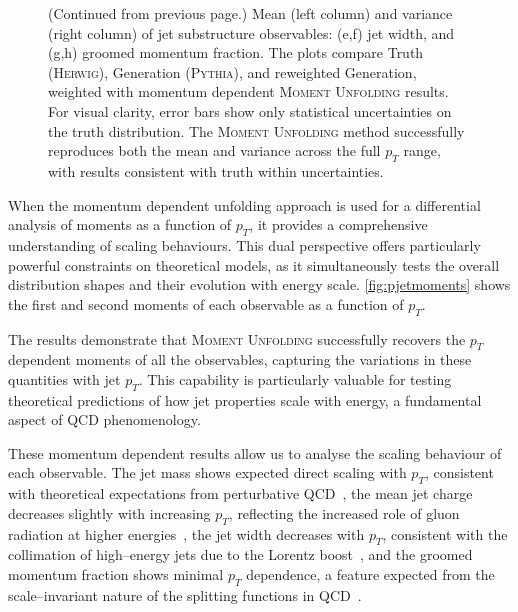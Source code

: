 \begin{figure}
{    \label{fig:pzgjetvar}}
    \caption[]{(Continued from previous page.) Mean (left column) and variance (right column) of jet substructure observables: (e,f) jet width, and (g,h) groomed momentum fraction. The plots compare Truth (\textsc{Herwig}), Generation (\textsc{Pythia}), and reweighted Generation, weighted with momentum dependent \textsc{Moment Unfolding} results. For visual clarity, error bars show only statistical uncertainties on the truth distribution. The \textsc{Moment Unfolding} method successfully reproduces both the mean and variance across the full $p_T$ range, with results consistent with truth within uncertainties.}
\end{figure}

            When the momentum dependent unfolding approach is used for a differential analysis of moments as a function of \(p_T\), it provides a comprehensive understanding of scaling behaviours.
            This dual perspective offers particularly powerful constraints on theoretical models, as it simultaneously tests the overall distribution shapes and their evolution with energy scale.
            \cref{fig:pjetmoments} shows the first and second moments of each observable as a function of $p_T$.

            The results demonstrate that \textsc{Moment Unfolding} successfully recovers the $p_T$ dependent moments of all the observables, capturing the variations in these quantities with jet \(p_T\).
            This capability is particularly valuable for testing theoretical predictions of how jet properties scale with energy, a fundamental aspect of QCD phenomenology.

            These momentum dependent results allow us to analyse the scaling behaviour of each observable.
            The jet mass shows expected direct scaling with $p_T$, consistent with theoretical expectations from perturbative QCD~\cite{ManganoINTRODUCTIONQCD, ParticleDataGroup:2020ssz, Czakon:2021mjy, CMS:2019fak, ALICE:2020pga, kogler_jet_2019, ALICE:2021njq, Dasgupta:2022fim, ATLAS:2014bjq},
            the mean jet charge decreases slightly with increasing $p_T$, reflecting the increased role of gluon radiation at higher energies~\cite{ATLAS:2015rlw, CMS:2017yer, Li:2019dre},
            the jet width decreases with $p_T$, consistent with the collimation of high--energy jets due to the Lorentz boost~\cite{ATLAS:2014hvo, ATLAS:2011lgt}, and
            the groomed momentum fraction shows minimal $p_T$ dependence, a feature expected from the scale--invariant nature of the splitting functions in QCD~\cite{ATLAS:2020bbn, CMS:2020poo, ATLASCollaboration2025ElectroweakLHC}.

